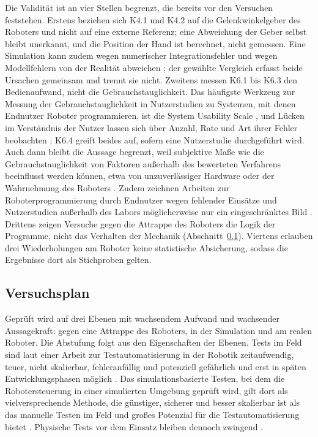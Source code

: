Die Validität ist an vier Stellen begrenzt, die bereits vor den Versuchen feststehen.
Erstens beziehen sich K4.1 und K4.2 auf die Gelenkwinkelgeber des Roboters und nicht auf eine externe Referenz; eine Abweichung der Geber selbst bleibt unerkannt, und die Position der Hand ist berechnet, nicht gemessen.
Eine Simulation kann zudem wegen numerischer Integrationsfehler und wegen Modellfehlern von der Realität abweichen \cite{Erez2015}; der gewählte Vergleich erfasst beide Ursachen gemeinsam und trennt sie nicht.
Zweitens messen K6.1 bis K6.3 den Bedienaufwand, nicht die Gebrauchstauglichkeit.
Das häufigste Werkzeug zur Messung der Gebrauchstauglichkeit in Nutzerstudien zu Systemen, mit denen Endnutzer Roboter programmieren, ist die System Usability Scale \cite{Ajaykumar2021}, und Lücken im Verständnis der Nutzer lassen sich über Anzahl, Rate und Art ihrer Fehler beobachten \cite{Ajaykumar2021}; K6.4 greift beides auf, sofern eine Nutzerstudie durchgeführt wird.
Auch dann bleibt die Aussage begrenzt, weil subjektive Maße wie die Gebrauchstauglichkeit von Faktoren außerhalb des bewerteten Verfahrens beeinflusst werden können, etwa von unzuverlässiger Hardware oder der Wahrnehmung des Roboters \cite{Ajaykumar2021}.
Zudem zeichnen Arbeiten zur Roboterprogrammierung durch Endnutzer wegen fehlender Einsätze und Nutzerstudien außerhalb des Labors möglicherweise nur ein eingeschränktes Bild \cite{Ajaykumar2021}.
Drittens zeigen Versuche gegen die Attrappe des Roboters die Logik der Programme, nicht das Verhalten der Mechanik (Abschnitt~\ref{sec:versuchsplan}).
Viertens erlauben drei Wiederholungen am Roboter keine statistische Absicherung, sodass die Ergebnisse dort als Stichproben gelten.

\subsection{Versuchsplan}
\label{sec:versuchsplan}
Geprüft wird auf drei Ebenen mit wachsendem Aufwand und wachsender Aussagekraft: gegen eine Attrappe des Roboters, in der Simulation und am realen Roboter.
Die Abstufung folgt aus den Eigenschaften der Ebenen.
Tests im Feld sind laut einer Arbeit zur Testautomatisierung in der Robotik zeitaufwendig, teuer, nicht skalierbar, fehleranfällig und potenziell gefährlich und erst in späten Entwicklungsphasen möglich \cite{Afzal2021}.
Das simulationsbasierte Testen, bei dem die Robotersteuerung in einer simulierten Umgebung geprüft wird, gilt dort als vielversprechende Methode, die günstiger, sicherer und besser skalierbar ist als das manuelle Testen im Feld und großes Potenzial für die Testautomatisierung bietet \cite{Afzal2021}.
Physische Tests vor dem Einsatz bleiben dennoch zwingend \cite{Choi2021}.

